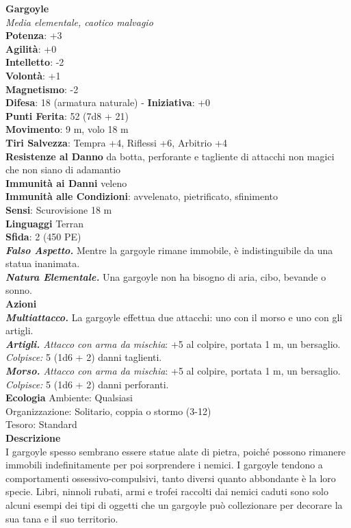 \begin{multicols}{2}
\medskip\textbf{Gargoyle}\\
\emph{Media elementale, caotico malvagio}\\
\textbf{Potenza}: +3\\
\textbf{Agilità}: +0\\
\textbf{Intelletto}: -2\\
\textbf{Volontà}: +1\\
\textbf{Magnetismo}: -2\\
\textbf{Difesa}: 18 (armatura naturale) - \textbf{Iniziativa}: +0\\
\textbf{Punti Ferita}: 52 (7d8 + 21)\\
\textbf{Movimento}: 9 m, volo 18 m\\
\textbf{Tiri Salvezza}: Tempra +4, Riflessi +6, Arbitrio +4\\
\textbf{Resistenze al Danno} da botta, perforante e tagliente di attacchi non magici che non siano di adamantio\\
\textbf{Immunità ai Danni} veleno\\
\textbf{Immunità alle Condizioni}: avvelenato, pietrificato, sfinimento\\
\textbf{Sensi}: Scurovisione 18 m\\
\textbf{Linguaggi} Terran\\
\textbf{Sfida}: 2 (450 PE)\smallskip\\
\emph{\textbf{Falso Aspetto.}} Mentre la gargoyle rimane immobile, è indistinguibile da una statua inanimata.\\
\emph{\textbf{Natura Elementale.}} Una gargoyle non ha bisogno di aria, cibo, bevande o sonno.\\
\smallskip\textbf{Azioni}\\
\emph{\textbf{Multiattacco.}} La gargoyle effettua due attacchi: uno con il morso e uno con gli artigli.\\
\emph{\textbf{Artigli.} Attacco con arma da mischia}: +5 al colpire, portata 1 m, un bersaglio.\\
\emph{Colpisce:} 5 (1d6 + 2) danni taglienti.\\
\emph{\textbf{Morso.} Attacco con arma da mischia}: +5 al colpire, portata 1 m, un bersaglio.\\
\emph{Colpisce:} 5 (1d6 + 2) danni perforanti.\\
\textbf{Ecologia}
Ambiente: Qualsiasi\\
Organizzazione: Solitario, coppia o stormo (3-12)\\
Tesoro: Standard\\
\textbf{Descrizione}\\
I gargoyle spesso sembrano essere statue alate di pietra, poiché possono rimanere immobili indefinitamente per poi sorprendere i nemici. I gargoyle tendono a comportamenti ossessivo-compulsivi, tanto diversi quanto abbondante è la loro specie. Libri, ninnoli rubati, armi e trofei raccolti dai nemici caduti sono solo alcuni esempi dei tipi di oggetti che un gargoyle può collezionare per decorare la sua tana e il suo territorio.\\


\end{multicols}
